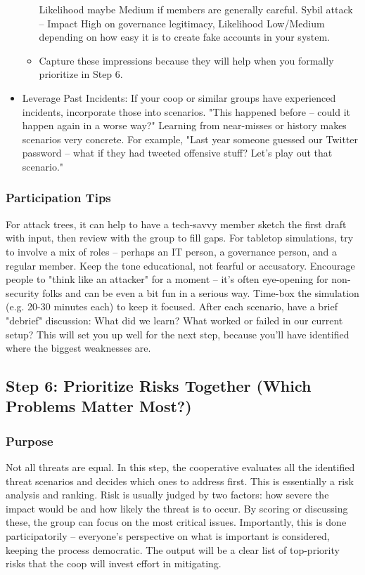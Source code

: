 \begin{itemize}
\begin{itemize}
            Likelihood maybe Medium if members are generally careful. Sybil attack – Impact High on governance
            legitimacy, Likelihood Low/Medium depending on how easy it is to create fake accounts in your
            system.
            \item Capture these impressions because they will help when you formally prioritize in Step 6.
        \end{itemize}
    \item Leverage Past Incidents: If your coop or similar groups have experienced incidents,
    incorporate those into scenarios. "This happened before – could it happen again in a worse way?"
    Learning from near-misses or history makes scenarios very concrete. For example, "Last year someone
    guessed our Twitter password – what if they had tweeted offensive stuff? Let's play out that
    scenario."
\end{itemize}

\subsubsection{Participation Tips}

For attack trees, it can help to have a tech-savvy member sketch the first draft
with input, then review with the group to fill gaps. For tabletop simulations,
try to involve a mix of roles – perhaps an IT person, a governance person, and a
regular member. Keep the tone educational, not fearful or accusatory. Encourage
people to "think like an attacker" for a moment – it's often eye-opening for
non-security folks and can be even a bit fun in a serious way. Time-box the
simulation (e.g. 20-30 minutes each) to keep it focused. After each scenario,
have a brief "debrief" discussion: What did we learn? What worked or failed in
our current setup? This will set you up well for the next step, because you'll
have identified where the biggest weaknesses are.

\subsection{Step 6: Prioritize Risks Together (Which Problems Matter Most?)}
\label{subsec:Step6}

\subsubsection{Purpose}

Not all threats are equal. In this step, the cooperative evaluates all the
identified threat scenarios and decides which ones to address first. This is
essentially a risk analysis and ranking. Risk is usually judged by two factors:
how severe the impact would be and how likely the threat is to occur. By scoring
or discussing these, the group can focus on the most critical issues.
Importantly, this is done participatorily – everyone's perspective on what is
important is considered, keeping the process democratic. The output will be a
clear list of top-priority risks that the coop will invest effort in mitigating.

